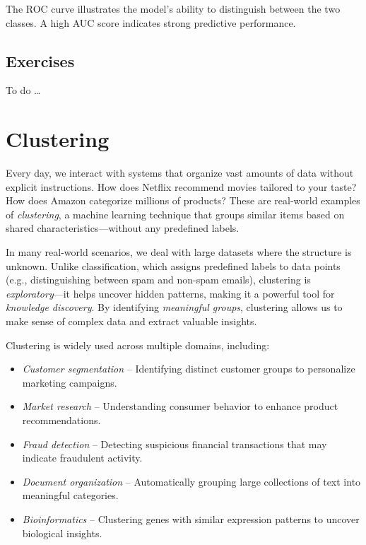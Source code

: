 \documentclass[
]{book}
\providecommand{\tightlist}{%
  \setlength{\itemsep}{0pt}\setlength{\parskip}{0pt}}
\theoremstyle{definition}
\theoremstyle{definition}
\theoremstyle{definition}
\theoremstyle{definition}
\theoremstyle{remark}
\begin{document}
The ROC curve illustrates the model's ability to distinguish between the two classes. A high AUC score indicates strong predictive performance.

\section{Exercises}\label{exercises-7}

To do \ldots{}

\chapter{Clustering}\label{chapter-cluster}

Every day, we interact with systems that organize vast amounts of data without explicit instructions. How does Netflix recommend movies tailored to your taste? How does Amazon categorize millions of products? These are real-world examples of \emph{clustering}, a machine learning technique that groups similar items based on shared characteristics---without any predefined labels.

In many real-world scenarios, we deal with large datasets where the structure is unknown. Unlike classification, which assigns predefined labels to data points (e.g., distinguishing between spam and non-spam emails), clustering is \emph{exploratory}---it helps uncover hidden patterns, making it a powerful tool for \emph{knowledge discovery}. By identifying \emph{meaningful groups}, clustering allows us to make sense of complex data and extract valuable insights.

Clustering is widely used across multiple domains, including:

\begin{itemize}
\tightlist
\item
  \emph{Customer segmentation} -- Identifying distinct customer groups to personalize marketing campaigns.\\
\item
  \emph{Market research} -- Understanding consumer behavior to enhance product recommendations.\\
\item
  \emph{Fraud detection} -- Detecting suspicious financial transactions that may indicate fraudulent activity.\\
\item
  \emph{Document organization} -- Automatically grouping large collections of text into meaningful categories.\\
\item
  \emph{Bioinformatics} -- Clustering genes with similar expression patterns to uncover biological insights.
\end{itemize}
\end{document}
